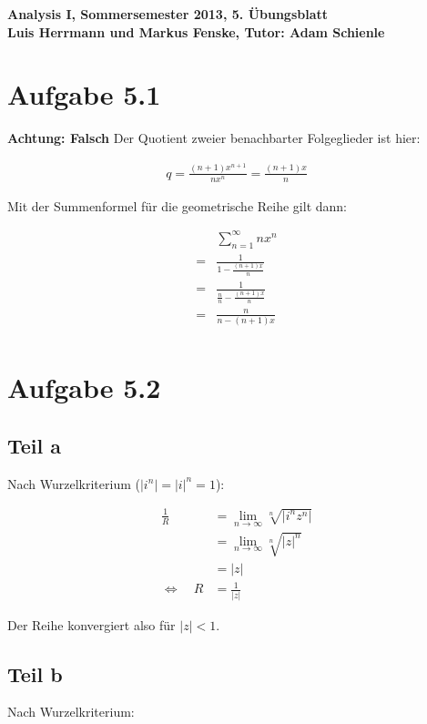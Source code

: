 \documentclass[a4paper,german,12pt,smallheadings]{scrartcl}
\begin{document}
\begin{center}
\bfseries %
\sffamily %
\vspace{-40pt}
Analysis I, Sommersemester 2013, 5. Übungsblatt \\
Luis Herrmann und Markus Fenske, Tutor: Adam Schienle
\vspace{-10pt}
\end{center}

\section{Aufgabe 5.1}
\textbf{Achtung: Falsch}
Der Quotient zweier benachbarter Folgeglieder ist hier:

\begin{align*}
  q = \frac{(n+1)x^{n+1}}{nx^n} = \frac{(n+1)x}{n}
\end{align*}

Mit der Summenformel für die geometrische Reihe gilt dann:

\begin{align*}
   &\sum_{n=1}^\infty n x^n \\
  =&\frac{1}{1 - \frac{(n+1)x}{n}} \\
  =&\frac{1}{\frac{n}{n} - \frac{(n+1)x}{n}} \\
  =&\frac{n}{n - (n+1)x} \\
\end{align*}
\section{Aufgabe 5.2}
\subsection*{Teil a}
Nach Wurzelkriterium ($|i^n| = |i|^n = 1$):

\begin{align*}
  \frac{1}{R} &= \lim_{n \to \infty} \sqrt[n]{|i^nz^n|} \\
              &= \lim_{n \to \infty} \sqrt[n]{|z|^n} \\
              &= |z| \\
  \Leftrightarrow\quad R &= \frac{1}{|z|}
\end{align*}

Der Reihe konvergiert also für $|z| < 1$.

\subsection*{Teil b}
Nach Wurzelkriterium:
\end{document}
